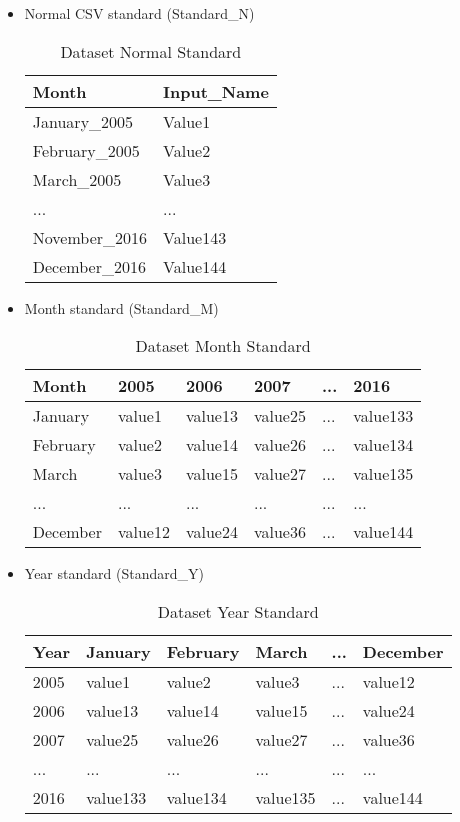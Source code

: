 \begin{itemize}
\item Normal CSV standard (Standard\_N)
\begin{table}[ht] 
    \centering 
    \begin{tabular}{ | l | l |}
        \hline
       	Month & Input\_Name\\ \hline
        January\_2005 & Value1 \\ \hline
        February\_2005 & Value2\\ \hline
        March\_2005 & Value3\\ \hline
        ... & ...\\ \hline
        November\_2016 & Value143\\ \hline
        December\_2016 & Value144\\ \hline
    \end{tabular}
    \caption[Dataset Normal Standard]{Dataset Normal Standard}
    \label{table: whether} 
\end{table}    

\item Month standard (Standard\_M)
\begin{table}[ht] 
    \centering 
    \begin{tabular}{ | l | l | l | l | l | l |}
        \hline
       	Month & 2005 & 2006 & 2007 & ... & 2016\\ \hline
        January & value1 & value13 & value25 & ... & value133\\ \hline
        February & value2 & value14 & value26 & ... & value134\\ \hline
        March & value3 & value15 & value27 & ... & value135\\ \hline
        ... & ... & ... & ... & ... & ...\\ \hline
        December & value12 & value24 & value36 & ... & value144\\ \hline
    \end{tabular}
    \caption[Dataset Month Standard]{Dataset Month Standard}
    \label{table: whether} 
\end{table}  

\item Year standard (Standard\_Y)
\begin{table}[ht] 
    \centering 
    \begin{tabular}{ | l | l | l | l | l | l |}
        \hline
       	Year & January & February & March & ... & December\\ \hline
        2005 & value1 & value2 & value3 & ... & value12\\ \hline
        2006 & value13 & value14 & value15 & ... & value24\\ \hline
        2007 & value25 & value26 & value27 & ... & value36\\ \hline
        ... & ... & ... & ... & ... & ...\\ \hline
        2016 & value133 & value134 & value135 & ... & value144\\ \hline
    \end{tabular}
    \caption[Dataset Year Standard]{Dataset Year Standard}
    \label{table: whether} 
\end{table}  
\end{itemize}

